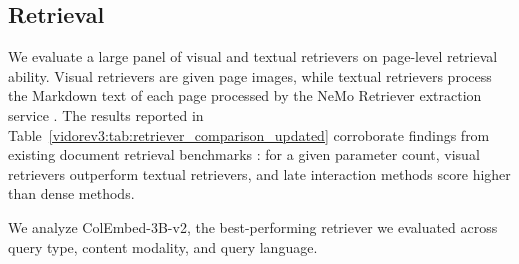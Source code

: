 \subsection{Retrieval} \label{vidorev3:sec:retrieval results}

We evaluate a large panel of visual and textual retrievers on page-level retrieval ability. Visual retrievers are given page images, while textual retrievers process the Markdown text of each page processed by the NeMo Retriever extraction service . The results reported in Table~\ref{vidorev3:tab:retriever_comparison_updated} corroborate findings from existing document retrieval benchmarks : for a given parameter count, visual retrievers outperform textual retrievers, and late interaction methods score higher than dense methods.



We analyze ColEmbed-3B-v2, the best-performing retriever we evaluated across query type, content modality, and query language. %

